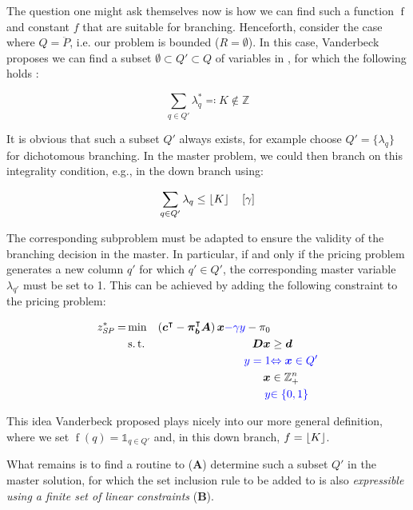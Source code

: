 The question one might ask themselves now is how we can find such a function $\operatorname{f}$ and constant $f$ that are suitable for branching. Henceforth, consider the case where $Q = \ddot{P}$, i.e. our problem is bounded ($R = \emptyset$). In this case, Vanderbeck proposes we can find a subset $\emptyset \subset Q' \subset Q$ of variables in \RMP{}, for which the following holds \cite{vanderbeck1996exact}:

\begin{equation}
\sum_{q \in Q'} \lambda_q^* \eqqcolon K \not\in \mathbb{Z}
\end{equation}

It is obvious that such a subset $Q'$ always exists, for example choose $Q' = \{\lambda_q\}$ for dichotomous branching. In the master problem, we could then branch on this integrality condition, e.g., in the down branch using:

\begin{equation}
\sum_{q \in Q'} \lambda_q \leq \lfloor K\rfloor \quad \left[\gamma\right]
\end{equation}

The corresponding subproblem must be adapted to ensure the validity of the branching decision in the master. In particular, if and only if the pricing problem generates a new column $q'$ for which $q' \in Q'$, the corresponding master variable $\lambda_{q'}$ must be set to 1. This can be achieved by adding the following constraint to the pricing problem:

\begin{equation}\label{eq:cg_bp_branchmaster_pricingmod}
\begin{aligned}
z^*_\SP{} = &\min & \left( \vec{c}\transpose - \vec{\pi}_\vec{b}\transpose \mat{A} \right) \vec{x} {\color{blue} - \gamma y} - \pi_0 & \\
&\st & \mat{D} \vec{x} & \geq \vec{d} \\
&& {\color{blue} y = 1} & {\color{blue} \Leftrightarrow \vec{x} \in Q'} \\
&& \vec{x} & \in \mathbb{Z}_+^n \\
&& {\color{blue} y} & {\color{blue} \in \{0, 1\}}
\end{aligned}
\end{equation}

This idea Vanderbeck proposed plays nicely into our more general definition, where we set $\operatorname{f}(q) = \mathbb{1}_{q \in Q'}$ and, in this down branch, $f = \lfloor K\rfloor$.

What remains is to find a routine to (\textbf{A}) determine such a subset $Q'$ in the master solution, for which the set inclusion rule to be added to \SP{} is also \textit{expressible using a finite set of linear constraints} (\textbf{B}).

